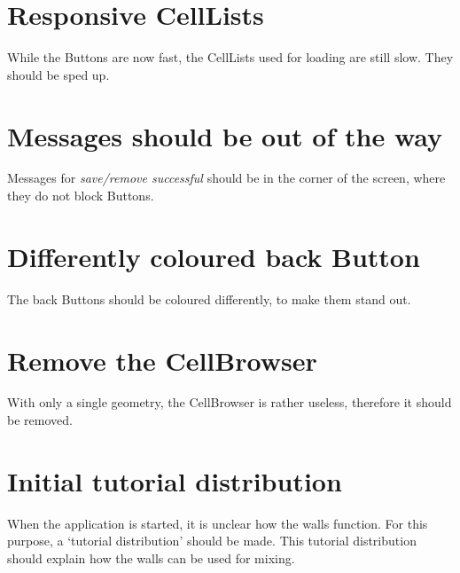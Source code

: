 \section*{Responsive CellLists}
While the Buttons are now fast, the CellLists used for loading are still slow. They should be sped up.

\section*{Messages should be out of the way}
Messages for \emph{save/remove successful} should be in the corner of the screen, where they do not block Buttons.

\section*{Differently coloured back Button}
The back Buttons should be coloured differently, to make them stand out.

\section*{Remove the CellBrowser}
With only a single geometry, the CellBrowser is rather useless, therefore it should be removed.

\section*{Initial tutorial distribution}
When the application is started, it is unclear how the walls function. For this purpose, a `tutorial distribution' should be made. This tutorial distribution should explain how the walls can be used for mixing.